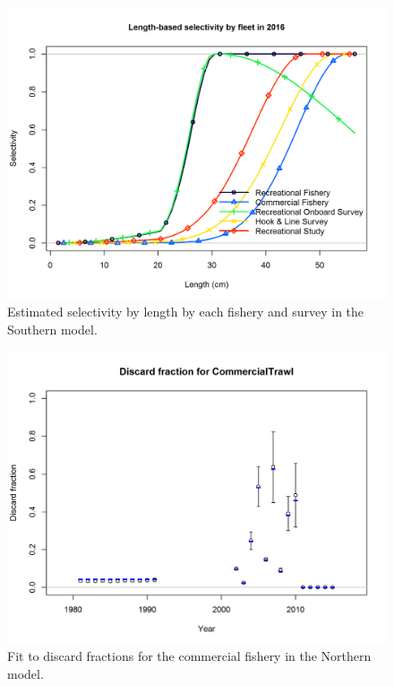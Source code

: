 \documentclass[12pt,]{article}
\begin{document}
\begin{figure}[htbp]
\centering
\includegraphics{r4ss/plots_mod2/sel01_multiple_fleets_length1.png}
\caption{Estimated selectivity by length by each fishery and survey in
the Southern model. \label{fig:selex}}
\end{figure}

\FloatBarrier 

\newpage

\begin{figure}[htbp]
\centering
\includegraphics{r4ss/plots_mod1/discard_dataCommercialTrawl.png}
\caption{Fit to discard fractions for the commercial fishery in the
Northern model.\label{fig:r4ss_discard_fits}}
\end{figure}
\end{document}
